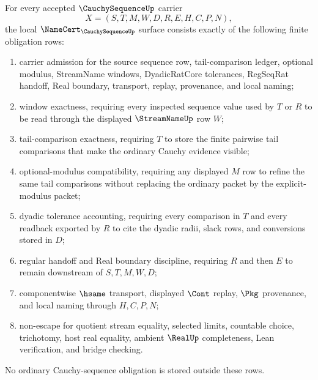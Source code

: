 \begin{theorem}
\label{thm:cauchy-sequence-namecert-obligations}
For every accepted $\CauchySequenceUp$ carrier
$$
X=(S,T,M,W,D,R,E,H,C,P,N),
$$
the local $\NameCert_{\CauchySequenceUp}$ surface consists exactly of the following finite obligation rows:
\begin{enumerate}
\item carrier admission for the source sequence row, tail-comparison ledger, optional modulus, StreamName windows, DyadicRatCore tolerances, RegSeqRat handoff, Real boundary, transport, replay, provenance, and local naming;
\item window exactness, requiring every inspected sequence value used by $T$ or $R$ to be read through the displayed $\StreamNameUp$ row $W$;
\item tail-comparison exactness, requiring $T$ to store the finite pairwise tail comparisons that make the ordinary Cauchy evidence visible;
\item optional-modulus compatibility, requiring any displayed $M$ row to refine the same tail comparisons without replacing the ordinary packet by the explicit-modulus packet;
\item dyadic tolerance accounting, requiring every comparison in $T$ and every readback exported by $R$ to cite the dyadic radii, slack rows, and conversions stored in $D$;
\item regular handoff and Real boundary discipline, requiring $R$ and then $E$ to remain downstream of $S,T,M,W,D$;
\item componentwise $\hsame$ transport, displayed $\Cont$ replay, $\Pkg$ provenance, and local naming through $H,C,P,N$;
\item non-escape for quotient stream equality, selected limits, countable choice, trichotomy, host real equality, ambient $\RealUp$ completeness, Lean verification, and bridge checking.
\end{enumerate}
No ordinary Cauchy-sequence obligation is stored outside these rows.
\end{theorem}
